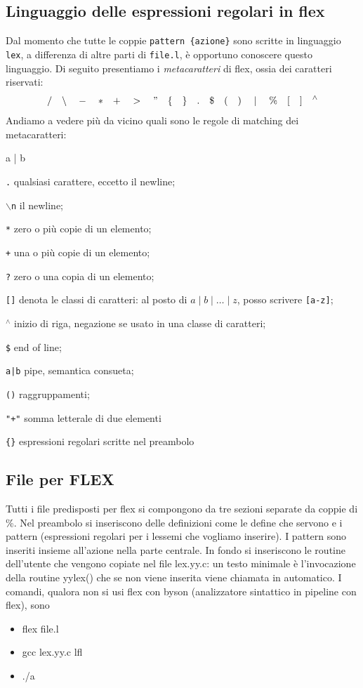 \documentclass[class=book, crop=false, oneside, 12pt]{standalone}
\begin{document}
\subsection{Linguaggio delle espressioni regolari in flex}
Dal momento che tutte le coppie \texttt{pattern \{azione\}} sono scritte in linguaggio \texttt{lex}, a differenza di altre parti di \texttt{file.l}, è opportuno conoscere questo linguaggio. Di seguito presentiamo i \emph{metacaratteri} di flex, ossia dei caratteri riservati:
\begin{equation*}
    \slash \quad \backslash \quad - \quad * \quad + \quad >\quad " \quad \{ \quad \} \quad . \quad \$ \quad ( \quad ) \quad \mid \quad \% \quad [ \quad ] \quad ^\wedge
\end{equation*}
\noindent Andiamo a vedere più da vicino quali sono le regole di matching dei metacaratteri:
\begin{labeling}{a | b}
    \item[\texttt{.}] qualsiasi carattere, eccetto il newline;
    \item[\texttt{\(\backslash\)n}] il newline;
    \item[\texttt{*}] zero o più copie di un elemento;
    \item[\texttt{+}] una o più copie di un elemento;
    \item[\texttt{?}] zero o una copia di un elemento;
    \item[\texttt{[]}] denota le classi di caratteri: al posto di \(a \mid b \mid \ldots \mid z\), posso scrivere \texttt{[a-z]};
    \item[\texttt{\(^\wedge\)}] inizio di riga, negazione se usato in una classe di caratteri;
    \item[\texttt{\$}] end of line;
    \item[\texttt{a|b}] pipe, semantica consueta;
    \item[\texttt{()}] raggruppamenti;
    \item[\texttt{"+"}] somma letterale di due elementi
    \item[\texttt{\{\}}] espressioni regolari scritte nel preambolo
\end{labeling}

\subsection{File per FLEX}
Tutti i file predisposti per flex si compongono da tre sezioni separate da coppie di \%. Nel preambolo si inseriscono delle definizioni come le define che servono e i pattern (espressioni regolari per i lessemi che vogliamo inserire). I pattern sono inseriti insieme all'azione nella parte centrale. In fondo si inseriscono le routine dell'utente che vengono copiate nel file lex.yy.c: un testo minimale è l'invocazione della routine yylex() che se non viene inserita viene chiamata in automatico. I comandi, qualora non si usi flex con byson (analizzatore sintattico in pipeline con flex), sono
\begin{itemize}
    \item flex file.l
    \item gcc lex.yy.c lfl
    \item ./a
\end{itemize}
\end{document}
